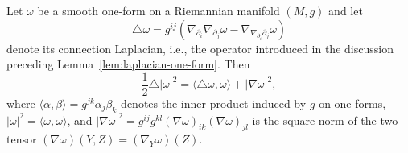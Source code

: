 \begin{lemma}
\label{lem:laplacian-square-norm-one-form}
Let $\omega$ be a smooth one-form on a Riemannian manifold $(M,g)$ and
let
$$\triangle\omega=g^{ij}\left(\nabla_{\partial_i}\nabla_{\partial_j}\omega
-\nabla_{\nabla_{\partial_i}\partial_j}\omega\right)$$
denote its connection Laplacian, i.e., the operator introduced in the
discussion preceding Lemma~\ref{lem:laplacian-one-form}. Then
$$\frac{1}{2}\triangle|\omega|^2
=\langle\triangle\omega,\omega\rangle+|\nabla\omega|^2,$$
where $\langle\alpha,\beta\rangle=g^{jk}\alpha_j\beta_k$ denotes the inner
product induced by $g$ on one-forms,
$|\omega|^2=\langle\omega,\omega\rangle$, and
$|\nabla\omega|^2=g^{ij}g^{kl}(\nabla\omega)_{ik}(\nabla\omega)_{jl}$ is the
square norm of the two-tensor $(\nabla\omega)(Y,Z)=(\nabla_Y\omega)(Z)$.
\end{lemma}

